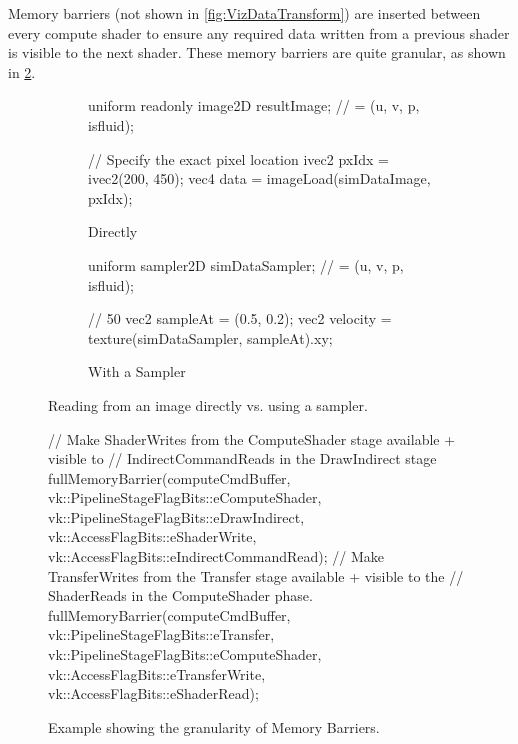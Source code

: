 Memory barriers (not shown in \cref{fig:VizDataTransform}) are inserted between every compute shader to ensure any required data written from a previous shader is visible to the next shader.
These memory barriers are quite granular, as shown in \cref{fig:VizMemoryBarrier}.

\begin{figure}
    \centering
     \begin{subfigure}[b]{0.49\textwidth}
         \centering
\begin{glslcode}
uniform readonly image2D resultImage;
 // = (u, v, p, isfluid);

// Specify the exact pixel location
ivec2 pxIdx = ivec2(200, 450);
vec4 data = imageLoad(simDataImage, pxIdx);
\end{glslcode}
\caption{Directly}
     \end{subfigure}
     \hfill
     \begin{subfigure}[b]{0.49\textwidth}
         \centering
\begin{glslcode}
uniform sampler2D simDataSampler;
 // = (u, v, p, isfluid);
 
// 50%
vec2 sampleAt = (0.5, 0.2);
vec2 velocity = texture(simDataSampler, sampleAt).xy;
\end{glslcode}
\caption{With a Sampler}
     \end{subfigure}
  \caption{Reading from an image directly vs. using a sampler.}
    \label{fig:VizImageRead}
\end{figure}
\begin{figure}
    \centering
    \begin{cppcode}
// Make ShaderWrites from the ComputeShader stage available + visible to 
//      IndirectCommandReads in the DrawIndirect stage
fullMemoryBarrier(computeCmdBuffer,
    vk::PipelineStageFlagBits::eComputeShader, vk::PipelineStageFlagBits::eDrawIndirect,
    vk::AccessFlagBits::eShaderWrite, vk::AccessFlagBits::eIndirectCommandRead);
// Make TransferWrites from the Transfer stage available + visible to the
//      ShaderReads in the ComputeShader phase.
fullMemoryBarrier(computeCmdBuffer,
    vk::PipelineStageFlagBits::eTransfer, vk::PipelineStageFlagBits::eComputeShader,
    vk::AccessFlagBits::eTransferWrite, vk::AccessFlagBits::eShaderRead);
    \end{cppcode}
    \caption{Example showing the granularity of Memory Barriers.}
    \label{fig:VizMemoryBarrier}
\end{figure}

